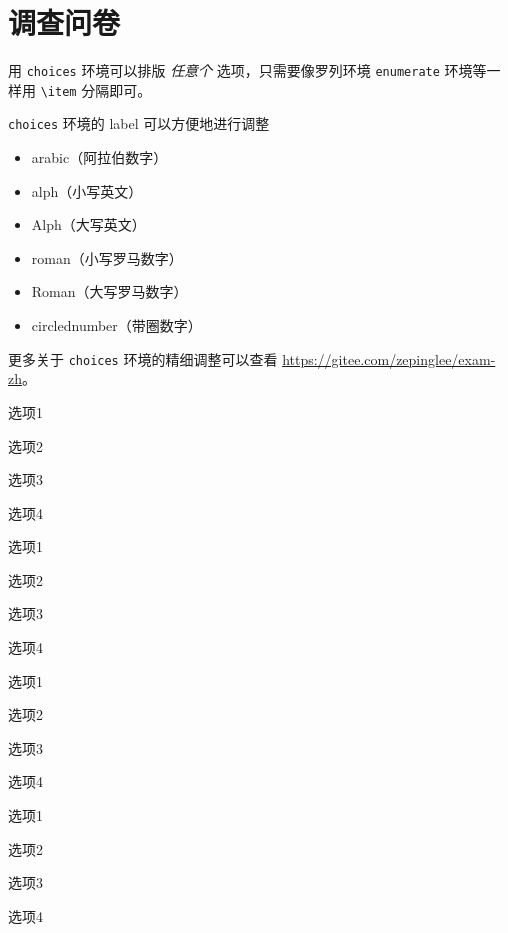 
\appendix


\chapter{调查问卷}

\iffalse

用 \verb|choices| 环境可以排版 \emph{任意个} 选项，只需要像罗列环境 \verb|enumerate| 环境等一样用 \verb|\item| 分隔即可。

\verb|choices| 环境的 label 可以方便地进行调整
\begin{itemize}
  \item arabic（阿拉伯数字）
  \item alph（小写英文）
  \item Alph（大写英文）
  \item roman（小写罗马数字）
  \item Roman（大写罗马数字）
  \item circlednumber（带圈数字）
\end{itemize}

更多关于 \verb|choices| 环境的精细调整可以查看 \url{https://gitee.com/zepinglee/exam-zh}。

\begin{choices}[label = \arabic*)]
  \item 选项1
  \item 选项2
  \item 选项3
  \item 选项4
\end{choices}

\begin{choices}[label = (\alph*]
  \item 选项1
  \item 选项2
  \item 选项3
  \item 选项4
\end{choices}

\begin{choices}[label = \Alph*.]
  \item 选项1
  \item 选项2
  \item 选项3
  \item 选项4
\end{choices}

\begin{choices}[label = \roman*:]
  \item 选项1
  \item 选项2
  \item 选项3
  \item 选项4
\end{choices}

